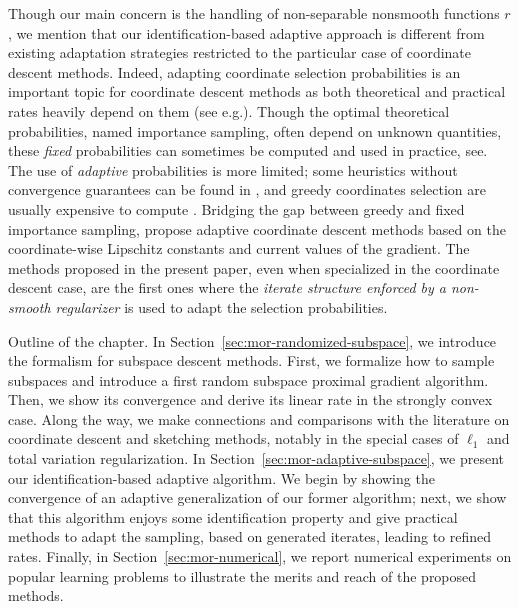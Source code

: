 Though our main concern is the handling of non-separable nonsmooth functions $r$, we mention that our identification-based adaptive approach is different from existing adaptation strategies restricted to the particular case of coordinate descent methods. Indeed, adapting coordinate selection probabilities is an important topic for coordinate descent methods as both theoretical and practical rates heavily depend on them (see e.g.\;\cite{richtarik2014iteration,necoara2014random}).
Though the optimal theoretical probabilities, named importance sampling, often depend on unknown quantities, these \emph{fixed} probabilities can sometimes be computed and used in practice, see\;\cite{zhao2015stochastic,richtarik2016optimal}.
The use of \emph{adaptive} probabilities is more limited; some heuristics without convergence guarantees can be found in \cite{loshchilov2011adaptive,glasmachers2013accelerated}, and greedy coordinates selection
are usually expensive to compute \cite{dhillon2011nearest,nutini2015coordinate,nutini2017let}. Bridging the gap between greedy and fixed importance sampling, \cite{perekrestenko2017faster,namkoong2017adaptive,stich2017safe} propose adaptive coordinate descent methods based on the coordinate-wise Lipschitz constants and current values of the gradient. 
The methods proposed in the present paper, even when specialized in the coordinate descent case, are the first ones where the \emph{iterate structure enforced by a non-smooth regularizer} is used to adapt the selection probabilities.

{\color{red} Outline of the chapter. In Section~\ref{sec:mor-randomized-subspace}, we introduce the formalism for subspace descent methods. First, we formalize how to sample subspaces and introduce a first random subspace proximal gradient algorithm. Then, we show its convergence and derive its linear rate in the strongly convex case. Along the way, we make connections and comparisons with the literature on coordinate descent and sketching methods, notably in the special cases of $\ell_1$ and total variation regularization. In Section~\ref{sec:mor-adaptive-subspace}, we present our identification-based adaptive algorithm. We begin by showing the convergence of an adaptive generalization of our former algorithm; next, we show that this algorithm enjoys some identification property and give practical methods to adapt the sampling, based on generated iterates, leading to refined rates. Finally, in Section~\ref{sec:mor-numerical}, we report numerical experiments on popular learning problems to illustrate the merits and reach of the proposed methods.
}
